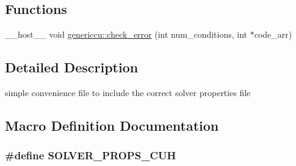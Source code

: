 \subsection*{Functions}
\begin{DoxyCompactItemize}
\item 
\+\_\+\+\_\+host\+\_\+\+\_\+ void \hyperlink{namespacegenericcu_af403dabfc12de79ff9ab8575983d6f83}{genericcu\+::check\+\_\+error} (int num\+\_\+conditions, int $\ast$code\+\_\+arr)
\end{DoxyCompactItemize}


\subsection{Detailed Description}
simple convenience file to include the correct solver properties file 



\subsection{Macro Definition Documentation}
\subsubsection[{\texorpdfstring{S\+O\+L\+V\+E\+R\+\_\+\+P\+R\+O\+P\+S\+\_\+\+C\+UH}{SOLVER_PROPS_CUH}}]{\setlength{\rightskip}{0pt plus 5cm}\#define S\+O\+L\+V\+E\+R\+\_\+\+P\+R\+O\+P\+S\+\_\+\+C\+UH}\hypertarget{solver__props_8cuh_abab1859a388294ac0be0474379ddc940}{}\label{solver__props_8cuh_abab1859a388294ac0be0474379ddc940}
